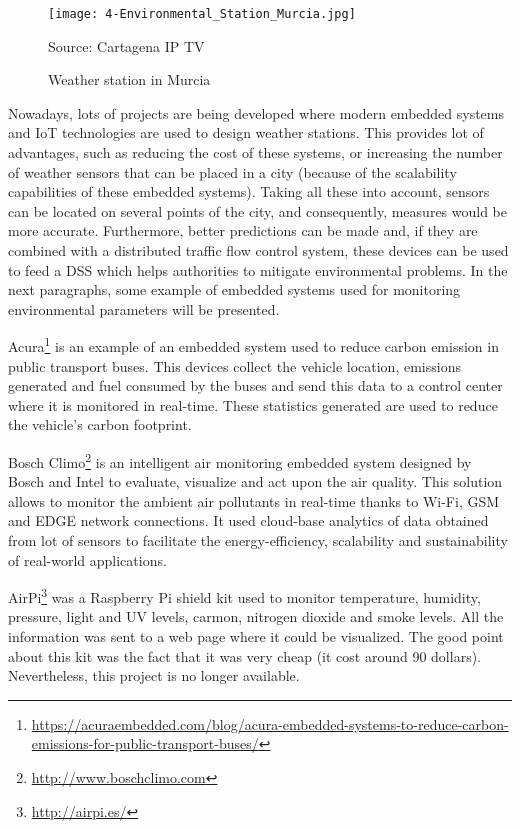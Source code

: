 \begin{figure}[!h]
	\begin{center}
		\texttt{[image: 4-Environmental\_Station\_Murcia.jpg]}
		\caption{Weather station in Murcia}
		\label{fig:4-Environmental_Station_Murcia}{Source: Cartagena IP TV}
	\end{center}
\end{figure}

Nowadays, lots of projects are being developed where modern embedded systems and IoT technologies are used to design weather stations. This provides lot of advantages, such as reducing the cost of these systems, or increasing the number of weather sensors that can be placed in a city (because of the scalability capabilities of these embedded systems). Taking all these into account, sensors can be located on several points of the city, and consequently, measures would be more accurate. Furthermore, better predictions can be made and, if they are combined with a distributed traffic flow control system, these devices can be used to feed a \ac{DSS} which helps authorities to mitigate environmental problems. In the next paragraphs, some example of embedded systems used for monitoring environmental parameters will be presented.

Acura\footnote{\url{https://acuraembedded.com/blog/acura-embedded-systems-to-reduce-carbon-emissions-for-public-transport-buses/}} is an example of an embedded system used to reduce carbon emission in public transport buses. This devices collect the vehicle location, emissions generated and fuel consumed by the buses and send this data to a control center where it is monitored in real-time. These statistics generated are used to reduce the vehicle's carbon footprint.

Bosch Climo\footnote{\url{http://www.boschclimo.com}} is an intelligent air monitoring embedded system designed by Bosch and Intel to evaluate, visualize and act upon the air quality. This solution allows to monitor the ambient air pollutants in real-time thanks to Wi-Fi, GSM and EDGE network connections. It used cloud-base analytics of data obtained from lot of sensors to facilitate the energy-efficiency, scalability and sustainability of real-world applications.




AirPi\footnote{\url{http://airpi.es/}} was a Raspberry Pi shield kit used to monitor temperature, humidity, pressure, light and UV levels, carmon, nitrogen dioxide and smoke levels. All the information was sent to a web page where it could be visualized. The good point about this kit was the fact that it was very cheap (it cost around 90 dollars).  Nevertheless, this project is no longer available.



